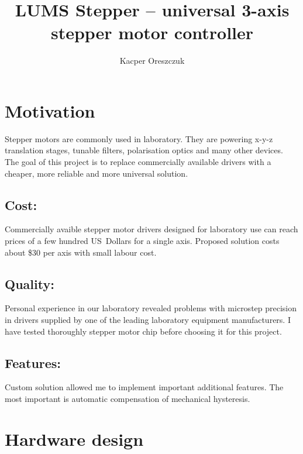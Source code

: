 \documentclass[10pt,article]{article}
\title{LUMS Stepper -- universal 3-axis stepper motor controller}
\author{Kacper Oreszczuk}
\date{}
\begin{document}
\maketitle
\section{Motivation}
Stepper motors are commonly used in laboratory. They are powering x-y-z translation stages, tunable filters, polarisation optics and many other devices. The goal of this project is to replace commercially available drivers with a cheaper, more reliable and more universal solution. 

\subsection*{Cost:}
Commercially avaible stepper motor drivers designed for laboratory use can reach prices
of a few hundred US\ Dollars for a single axis. Proposed solution costs about \$30 per axis with small
labour cost.

\subsection*{Quality:}
Personal experience in our laboratory revealed problems with microstep precision in drivers supplied by one of the leading laboratory equipment manufacturers. I have tested thoroughly stepper motor chip before choosing it for this project. 
\subsection*{Features:}
Custom solution allowed me to implement important additional features. The most important is automatic compensation of mechanical hysteresis.

\section{Hardware design}
\end{document}
